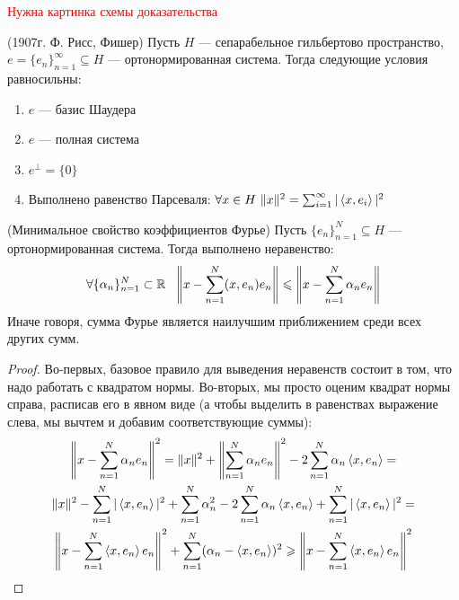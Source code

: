 \textcolor{red}{Нужна картинка схемы доказательства}

\begin{theorem} (1907г. Ф. Рисс, Фишер)
	Пусть $H$ --- сепарабельное гильбертово пространство, $e = \{e_n\}_{n = 1}^\infty \subseteq H$ --- ортонормированная система. Тогда следующие условия равносильны:
	\begin{enumerate}
		\item $e$ --- базис Шаудера
		
		\item $e$ --- полная система
		
		\item $e^\bot = \{0\}$
		
		\item Выполнено равенство Парсеваля: $\forall x \in H\ \|x\|^2 = \sum_{i = 1}^\infty |\left\langle x, e_i\right\rangle|^2$
	\end{enumerate}
\end{theorem}

\begin{lemma} (Минимальное свойство коэффициентов Фурье)
	Пусть $\{e_n\}_{n = 1}^N \subseteq H$ --- ортонормированная система. Тогда выполнено неравенство:
	\[
	\forall \{\alpha_n\}_{n = 1}^N \subset \R\ \ \no{x - \sum_{n = 1}^N (x, e_n)e_n} \le \no{x - \sum_{n = 1}^N \alpha_n e_n}
	\]
	Иначе говоря, сумма Фурье является наилучшим приближением среди всех других сумм.
\end{lemma}

\begin{proof}
	Во-первых, базовое правило для выведения неравенств состоит в том, что надо работать с квадратом нормы. Во-вторых, мы просто оценим квадрат нормы справа, расписав его в явном виде (а чтобы выделить в равенствах выражение слева, мы вычтем и добавим соответствующие суммы):
	\begin{multline*}
	\left\|x - \sum_{n = 1}^N \alpha_n e_n\right\|^2 = \|x\|^2 + \left\|\sum_{n = 1}^N \alpha_n e_n\right\|^2 - 2\sum_{n = 1}^N \alpha_n \left\langle x, e_n\right\rangle =
	\\
	\|x\|^2 - \sum_{n = 1}^N |\left\langle x, e_n\right\rangle|^2 + \sum_{n = 1}^N \alpha_n^2 - 2\sum_{n = 1}^N \alpha_n\left\langle x, e_n\right\rangle + \sum_{n = 1}^N |\left\langle x, e_n\right\rangle|^2 =
	\\
	\left\|x - \sum_{n = 1}^N \left\langle x, e_n\right\rangle e_n\right\|^2 + \sum_{n = 1}^N (\alpha_n - \left\langle x, e_n\right\rangle)^2 \geqslant \left\|x - \sum_{n = 1}^N \left\langle x, e_n\right\rangle e_n\right\|^2
	\end{multline*}
\end{proof}

